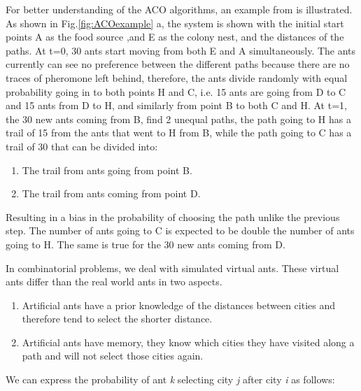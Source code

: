 \documentclass[twocolumn]{article}
\begin{document}
	For better understanding of the ACO algorithms, an example from\cite{ACOExample} is illustrated. As shown in Fig.\ref{fig:ACOexample} a, the system is shown with the initial start points A as the food source ,and E as the colony nest, and the distances of the paths. At t=0, 30 ants start moving from both E and A simultaneously. The ants currently can see no preference between the different paths because there are no traces of pheromone left behind, therefore, the ants divide randomly with equal probability going in to both points H and C, i.e. 15 ants are going from D to C and 15 ants from D to H, and similarly from point B to both C and H. At t=1, the 30 new ants coming from B, find 2 unequal paths, the path going to H has a trail of 15 from the ants that went to H from B, while the path going to C has a trail of 30 that can be divided into:
	\begin{enumerate}
		\item The trail from ants going from point B.
		\item The trail from ants coming from point D.
	\end{enumerate}
	 Resulting in a bias in the probability of choosing the path unlike the previous step. The number of ants going to C is expected to be double the number of ants going to H. The same is true for the 30 new ants coming from D.
	
	In combinatorial problems\cite{ACO}, we deal with simulated virtual ants. These virtual ants differ than the real world ants in two aspects.
	\begin{enumerate}
		\item Artificial ants have a prior knowledge of the distances between cities and therefore tend to select the shorter distance.
		\item Artificial ants have memory, they know which cities they have visited along a path and will not select those cities again.
	\end{enumerate}
	We can express the probability of ant \textit{k} selecting city \textit{j} after city \textit{i} as follows:
	
\end{document}
